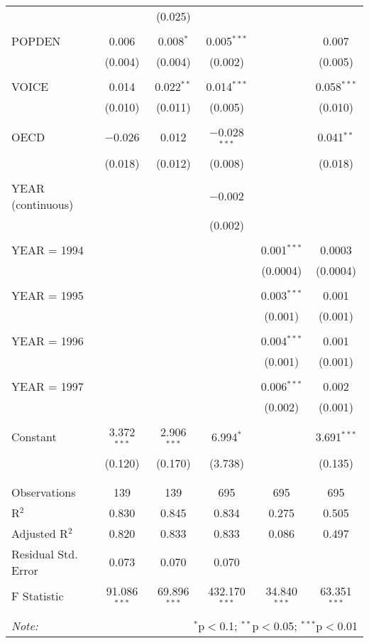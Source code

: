 \documentclass[12pt,a4paper]{article}\usepackage[]{graphicx}\usepackage[]{color}
\begin{document}
\begin{table}[!htbp]
\begin{tabular}{@{\extracolsep{5pt}}lccccc}
  &  & (0.025) &  &  &  \\ 
  & & & & & \\ 
 POPDEN & 0.006 & 0.008$^{*}$ & 0.005$^{***}$ &  & 0.007 \\ 
  & (0.004) & (0.004) & (0.002) &  & (0.005) \\ 
  & & & & & \\ 
 VOICE & 0.014 & 0.022$^{**}$ & 0.014$^{***}$ &  & 0.058$^{***}$ \\ 
  & (0.010) & (0.011) & (0.005) &  & (0.010) \\ 
  & & & & & \\ 
 OECD & $-$0.026 & 0.012 & $-$0.028$^{***}$ &  & 0.041$^{**}$ \\ 
  & (0.018) & (0.012) & (0.008) &  & (0.018) \\ 
  & & & & & \\ 
 YEAR (continuous) &  &  & $-$0.002 &  &  \\ 
  &  &  & (0.002) &  &  \\ 
  & & & & & \\ 
 YEAR = 1994 &  &  &  & 0.001$^{***}$ & 0.0003 \\ 
  &  &  &  & (0.0004) & (0.0004) \\ 
  & & & & & \\ 
 YEAR = 1995 &  &  &  & 0.003$^{***}$ & 0.001 \\ 
  &  &  &  & (0.001) & (0.001) \\ 
  & & & & & \\ 
 YEAR = 1996 &  &  &  & 0.004$^{***}$ & 0.001 \\ 
  &  &  &  & (0.001) & (0.001) \\ 
  & & & & & \\ 
 YEAR = 1997 &  &  &  & 0.006$^{***}$ & 0.002 \\ 
  &  &  &  & (0.002) & (0.001) \\ 
  & & & & & \\ 
 Constant & 3.372$^{***}$ & 2.906$^{***}$ & 6.994$^{*}$ &  & 3.691$^{***}$ \\ 
  & (0.120) & (0.170) & (3.738) &  & (0.135) \\ 
  & & & & & \\ 
\hline \\[-1.8ex] 
Observations & 139 & 139 & 695 & 695 & 695 \\ 
R$^{2}$ & 0.830 & 0.845 & 0.834 & 0.275 & 0.505 \\ 
Adjusted R$^{2}$ & 0.820 & 0.833 & 0.833 & 0.086 & 0.497 \\ 
Residual Std. Error & 0.073 & 0.070 & 0.070 &  &  \\ 
F Statistic & 91.086$^{***}$ & 69.896$^{***}$ & 432.170$^{***}$ & 34.840$^{***}$ & 63.351$^{***}$ \\ 
\hline 
\hline \\[-1.8ex] 
\textit{Note:}  & \multicolumn{5}{r}{$^{*}$p$<$0.1; $^{**}$p$<$0.05; $^{***}$p$<$0.01} \\ 
\end{tabular} 
\end{table} 
\end{document}
